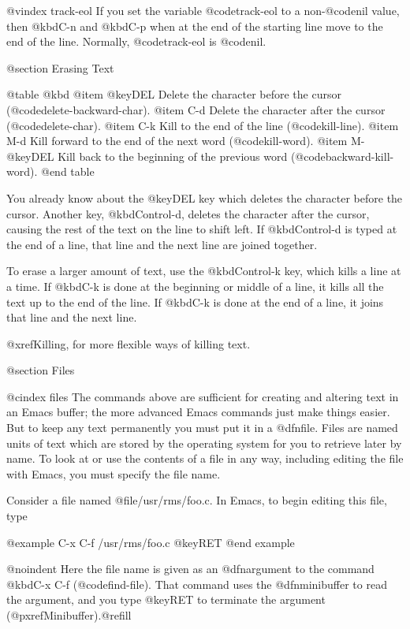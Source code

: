 {{{@vindex track-eol
  If you set the variable @code{track-eol} to a non-@code{nil} value, then
@kbd{C-n} and @kbd{C-p} when at the end of the starting line move to the
end of the line.  Normally, @code{track-eol} is @code{nil}.

@section Erasing Text

@table @kbd
@item @key{DEL}
Delete the character before the cursor (@code{delete-backward-char}).
@item C-d
Delete the character after the cursor (@code{delete-char}).
@item C-k
Kill to the end of the line (@code{kill-line}).
@item M-d
Kill forward to the end of the next word (@code{kill-word}).
@item M-@key{DEL}
Kill back to the beginning of the previous word
(@code{backward-kill-word}).
@end table

  You already know about the @key{DEL} key which deletes the character
before the cursor.  Another key, @kbd{Control-d}, deletes the character
after the cursor, causing the rest of the text on the line to shift left.
If @kbd{Control-d} is typed at the end of a line, that line and the next
line are joined together.

  To erase a larger amount of text, use the @kbd{Control-k} key, which
kills a line at a time.  If @kbd{C-k} is done at the beginning or middle of
a line, it kills all the text up to the end of the line.  If @kbd{C-k} is
done at the end of a line, it joins that line and the next line.

  @xref{Killing}, for more flexible ways of killing text.

@section Files

@cindex files
  The commands above are sufficient for creating and altering text in an
Emacs buffer; the more advanced Emacs commands just make things easier.
But to keep any text permanently you must put it in a @dfn{file}.  Files
are named units of text which are stored by the operating system for you to
retrieve later by name.  To look at or use the contents of a file in any
way, including editing the file with Emacs, you must specify the file name.

  Consider a file named @file{/usr/rms/foo.c}.  In Emacs, to begin editing
this file, type

@example
C-x C-f /usr/rms/foo.c @key{RET}
@end example

@noindent
Here the file name is given as an @dfn{argument} to the command @kbd{C-x
C-f} (@code{find-file}).  That command uses the @dfn{minibuffer} to
read the argument, and you type @key{RET} to terminate the argument
(@pxref{Minibuffer}).@refill

}}}
